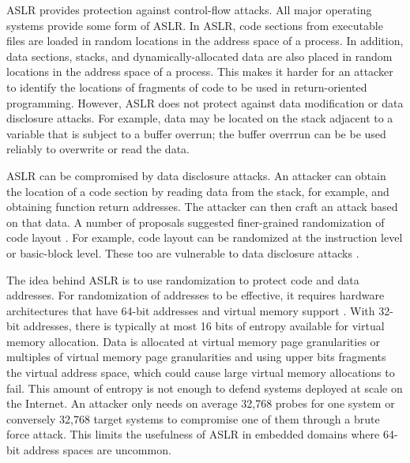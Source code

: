 ASLR \cite{PaX2003,WikipediaASLR} provides protection against 
control-flow attacks.   All major operating systems provide
some form of ASLR. In ASLR, code
sections from executable files are loaded in random locations in the
address space of a process.  In addition, data sections, stacks, and
dynamically-allocated data are also placed in random locations in the address
space of a process. This makes it harder for an attacker to identify the locations of fragments of code to be used in return-oriented programming.  However, ASLR does
not protect against data modification or data disclosure attacks. For example, data 
may be located on the stack adjacent to a
variable that is subject to a buffer overrun; the buffer overrrun can be
be used reliably to overwrite or read the data.   

ASLR can be compromised by data disclosure attacks.  An attacker can obtain the
location of a code section by reading data from the stack, for example, and obtaining function return addresses.  The attacker can then craft an attack based on that data. 
A number of proposals suggested finer-grained  randomization of code layout
\cite{Bhatkar2005, Hiser2012, Kil2006, Pappas2012,Wartell2012}.
For example, code layout can be randomized at the instruction level or
basic-block level. These too are vulnerable to 
data disclosure attacks \cite{Snow2013}.

The idea behind ASLR is to use randomization to protect
code and data addresses.  For randomization of addresses to be effective, 
it requires hardware  architectures that have 64-bit addresses and 
virtual memory support \cite{Shacham2004}.  With 32-bit addresses, 
there is typically  at most 16 bits of entropy available for
virtual memory allocation.  Data is allocated at virtual memory
page granularities or multiples of virtual memory page granularities
and using upper bits fragments the virtual address space, which
could cause large virtual memory allocations to fail.  This
amount of entropy is not enough to defend systems deployed at scale on
the Internet.  An attacker only needs on average 32,768 probes for one system or 
conversely 32,768 target systems to compromise one of them through a
brute force attack.
This limits the usefulness of ASLR in embedded domains where 
64-bit address spaces are uncommon.  

